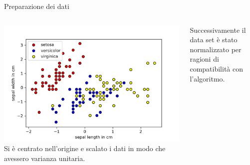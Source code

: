 \documentclass{beamer}
\begin{document}
    \begin{frame}{Preparazione dei dati}
        \begin{columns}
            \includegraphics[width=\columnwidth]{gfx/iris/irisscaled}
            Si è centrato nell'origine e scalato i dati in modo che avessero varianza unitaria. 

            Successivamente il data set è stato normalizzato per ragioni di compatibilità con l'algoritmo. 
        \end{columns}

        \vspace{.5cm}


\end{frame}
\end{document}
